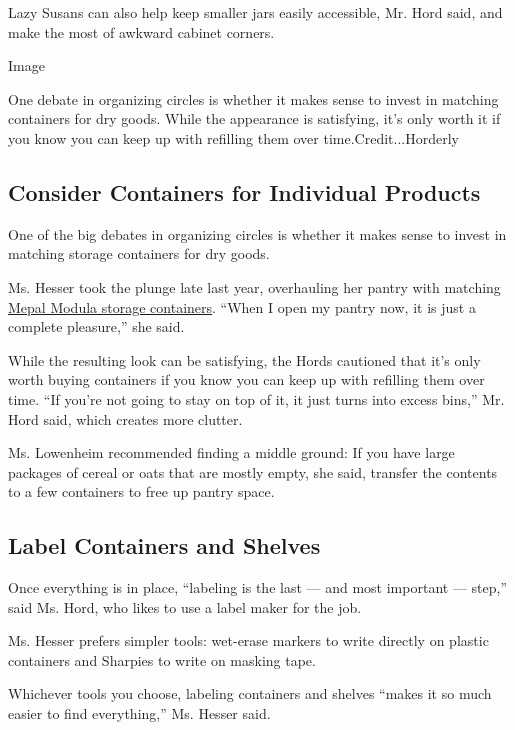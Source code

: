 Lazy Susans can also help keep smaller jars easily accessible, Mr. Hord
said, and make the most of awkward cabinet corners.

Image

One debate in organizing circles is whether it makes sense to invest in
matching containers for dry goods. While the appearance is satisfying,
it's only worth it if you know you can keep up with refilling them over
time.Credit...Horderly

\hypertarget{consider-containers-for-individual-products}{%
\subsection{Consider Containers for Individual
Products}\label{consider-containers-for-individual-products}}

One of the big debates in organizing circles is whether it makes sense
to invest in matching storage containers for dry goods.

Ms. Hesser took the plunge late last year, overhauling her pantry with
matching
\href{https://food52.com/shop/products/3221-modula-stackable-storage-container-starter-set}{Mepal
Modula storage containers}. ``When I open my pantry now, it is just a
complete pleasure,'' she said.

While the resulting look can be satisfying, the Hords cautioned that
it's only worth buying containers if you know you can keep up with
refilling them over time. ``If you're not going to stay on top of it, it
just turns into excess bins,'' Mr. Hord said, which creates more
clutter.

Ms. Lowenheim recommended finding a middle ground: If you have large
packages of cereal or oats that are mostly empty, she said, transfer the
contents to a few containers to free up pantry space.

\hypertarget{label-containers-and-shelves}{%
\subsection{Label Containers and
Shelves}\label{label-containers-and-shelves}}

Once everything is in place, ``labeling is the last --- and most
important --- step,'' said Ms. Hord, who likes to use a label maker for
the job.

Ms. Hesser prefers simpler tools: wet-erase markers to write directly on
plastic containers and Sharpies to write on masking tape.

Whichever tools you choose, labeling containers and shelves ``makes it
so much easier to find everything,'' Ms. Hesser said.

